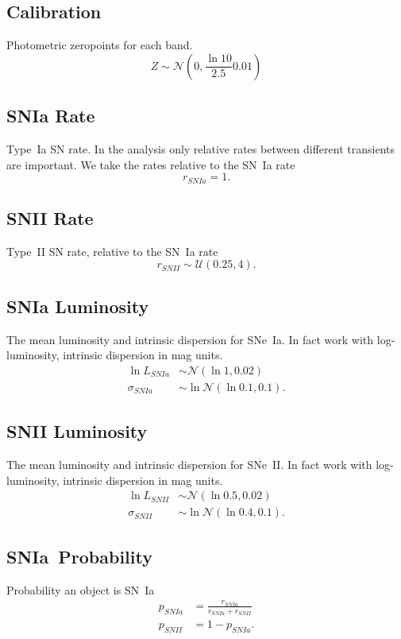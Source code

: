\documentclass[preprint,3p]{elsarticle}
\begin{document}
\subsection{Calibration}
Photometric zeropoints for each band.
\begin{equation}
Z \sim \mathcal{N}(0,\frac{\ln{10}}{2.5}0.01)
\end{equation}

\subsection{SNIa Rate}
Type~Ia SN rate. In the analysis only relative rates between different transients are important.
We take the rates relative to the SN~Ia rate
\begin{equation}
r_{SNIa} = 1.
\end{equation}

\subsection{SNII Rate}
Type~II SN rate, relative to the SN~Ia rate
\begin{equation}
r_{SNII} \sim \mathcal{U}(0.25, 4).
\end{equation}

\subsection{SNIa Luminosity}
The mean luminosity and intrinsic dispersion for SNe~Ia. In fact work with log-luminosity, intrinsic
dispersion in mag units.
\begin{align}
\ln{L}_{SNIa} & \sim \mathcal{N}(\ln{1}, 0.02) \\
\sigma_{SNIa} & \sim \ln{\mathcal{N}}(\ln{0.1},0.1).
\end{align}

\subsection{SNII Luminosity}
The mean luminosity and intrinsic dispersion for SNe~II. In fact work with log-luminosity, intrinsic
dispersion in mag units.
\begin{align}
\ln{L}_{SNII} & \sim \mathcal{N}(\ln{0.5}, 0.02) \\
\sigma_{SNII} & \sim \ln{\mathcal{N}}(\ln{0.4},0.1).
\end{align}

\subsection{SNIa~Probability}
Probability an object is SN~Ia
\begin{align}
p_{SNIa} &= \frac{r_{SNIa}}{r_{SNIa}+r_{SNII}} \nonumber \\
p_{SNII}&=1-p_{SNIa}.
\label{prob:eqn}
\end{align}
\end{document}
